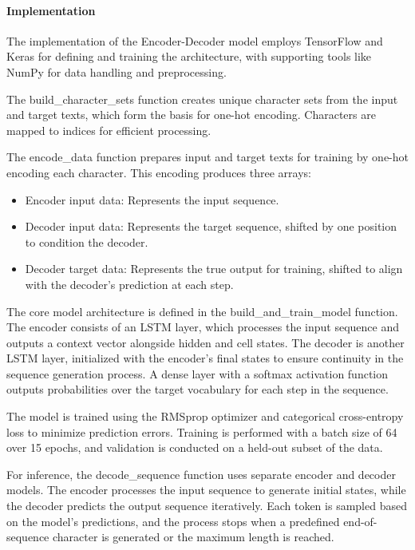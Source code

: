 \documentclass{article}
\begin{document}
\paragraph{Implementation}
The implementation of the Encoder-Decoder model employs TensorFlow and Keras for defining and training the architecture, with supporting tools like NumPy for data handling and preprocessing.

The build\_character\_sets function creates unique character sets from the input and target texts, which form the basis for one-hot encoding. Characters are mapped to indices for efficient processing.

The encode\_data function prepares input and target texts for training by one-hot encoding each character. This encoding produces three arrays:
\begin{itemize}
    \item Encoder input data: Represents the input sequence.
    \item Decoder input data: Represents the target sequence, shifted by one position to condition the decoder.
    \item Decoder target data: Represents the true output for training, shifted to align with the decoder's prediction at each step.
\end{itemize}

The core model architecture is defined in the build\_and\_train\_model function. The encoder consists of an LSTM layer, which processes the input sequence and outputs a context vector alongside hidden and cell states. The decoder is another LSTM layer, initialized with the encoder's final states to ensure continuity in the sequence generation process. A dense layer with a softmax activation function outputs probabilities over the target vocabulary for each step in the sequence.

The model is trained using the RMSprop optimizer and categorical cross-entropy loss to minimize prediction errors. Training is performed with a batch size of 64 over 15 epochs, and validation is conducted on a held-out subset of the data.

For inference, the decode\_sequence function uses separate encoder and decoder models. The encoder processes the input sequence to generate initial states, while the decoder predicts the output sequence iteratively. Each token is sampled based on the model's predictions, and the process stops when a predefined end-of-sequence character is generated or the maximum length is reached.
\end{document}
